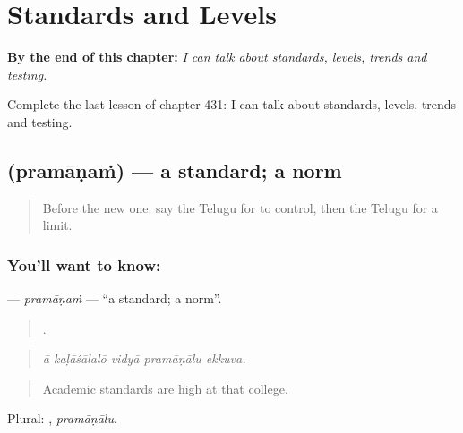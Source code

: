 
\chapter{Standards and Levels}
\label{ch:te-standards-and-levels}

\begin{chapteropening}
\textbf{By the end of this chapter:} \emph{I can talk about standards, levels, trends and testing.}

Complete the last lesson of chapter 431: I can talk about standards, levels, trends and testing.
\end{chapteropening}

\section[\texorpdfstring{\te{ప్రమాణం} (pramāṇaṁ)}{ప్రమాణం (pramāṇaṁ)}]{ (pramāṇaṁ) — a standard; a norm}

\label{lesson:TE-C431-pramanam}



\begin{quote}
Before the new one: say the Telugu for to control, then the Telugu for a limit.
\end{quote}

\subsection*{You'll want to know: }
\textbf{} — \emph{pramāṇaṁ} — \textquotedblleft{}a standard; a norm\textquotedblright{}.

\begin{quote}
    .
\end{quote}

\begin{quote}
\emph{ā kaḷāśālalō vidyā pramāṇālu ekkuva.}
\end{quote}

\begin{quote}
Academic standards are high at that college.
\end{quote}

Plural: , \emph{pramāṇālu}.

